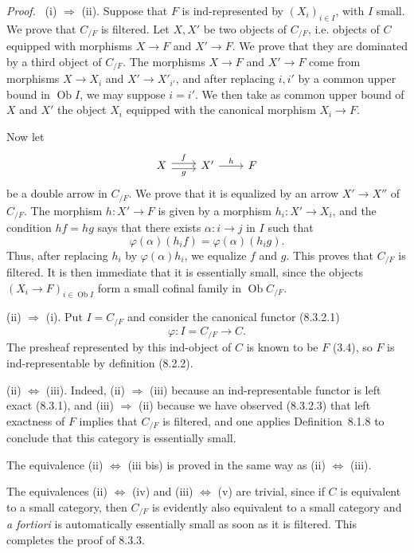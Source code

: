 \documentclass[11pt]{article}
\newcommand{\Ob}{\operatorname{Ob}}
\newenvironment{proofsketch}{\par\noindent\emph{Proof.}\ }{\par\medskip}
\begin{document}
\begin{proofsketch}
(i) $\Rightarrow$ (ii). Suppose that $F$ is ind-represented by $(X_i)_{i\in I}$, with $I$ small. We prove that $C_{/F}$ is filtered. Let $X,X'$ be two objects of $C_{/F}$, i.e. objects of $C$ equipped with morphisms $X\to F$ and $X'\to F$. We prove that they are dominated by a third object of $C_{/F}$. The morphisms $X\to F$ and $X'\to F$ come from morphisms $X\to X_i$ and $X'\to X'_{i'}$, and after replacing $i,i'$ by a common upper bound in $\Ob I$, we may suppose $i=i'$. We then take as common upper bound of $X$ and $X'$ the object $X_i$ equipped with the canonical morphism $X_i\to F$.

Now let
\[
\begin{tikzcd}[column sep=2.2em]
X \arrow[r,shift left=.55ex,"f"] \arrow[r,shift right=.55ex,swap,"g"] & X' \arrow[r,"h"] & F
\end{tikzcd}
\]
be a double arrow in $C_{/F}$. We prove that it is equalized by an arrow $X'\to X''$ of $C_{/F}$. The morphism $h:X'\to F$ is given by a morphism $h_i:X'\to X_i$, and the condition $hf=hg$ says that there exists $\alpha:i\to j$ in $I$ such that
\[
\varphi(\alpha)(h_if)=\varphi(\alpha)(h_ig).
\]
Thus, after replacing $h_i$ by $\varphi(\alpha)h_i$, we equalize $f$ and $g$. This proves that $C_{/F}$ is filtered. It is then immediate that it is essentially small, since the objects $(X_i\to F)_{i\in\Ob I}$ form a small cofinal family in $\Ob C_{/F}$.

(ii) $\Rightarrow$ (i). Put $I=C_{/F}$ and consider the canonical functor (8.3.2.1)
\[
\varphi:I=C_{/F}\longrightarrow C.
\]
The presheaf represented by this ind-object of $C$ is known to be $F$ (3.4), so $F$ is ind-representable by definition (8.2.2).

(ii) $\Leftrightarrow$ (iii). Indeed, (ii) $\Rightarrow$ (iii) because an ind-representable functor is left exact (8.3.1), and (iii) $\Rightarrow$ (ii) because we have observed (8.3.2.3) that left exactness of $F$ implies that $C_{/F}$ is filtered, and one applies Definition~8.1.8 to conclude that this category is essentially small.

The equivalence (ii) $\Leftrightarrow$ (iii bis) is proved in the same way as (ii) $\Leftrightarrow$ (iii).

The equivalences (ii) $\Leftrightarrow$ (iv) and (iii) $\Leftrightarrow$ (v) are trivial, since if $C$ is equivalent to a small category, then $C_{/F}$ is evidently also equivalent to a small category and \emph{a fortiori} is automatically essentially small as soon as it is filtered. This completes the proof of 8.3.3.
\end{proofsketch}
\end{document}
